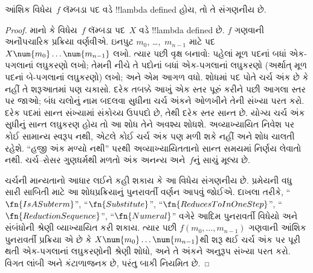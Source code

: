 \documentclass[../../../include/open-logic-section]{subfiles}
\begin{document}

\begin{thm}
આંશિક વિધેય~$f$ લૅમ્બડા પદ વડે !!{lambda defined} હોય, તો તે
સંગણનીય છે.
\end{thm}

\begin{proof}
માનો કે વિધેય~$f$ લૅમ્બડા પદ~$X$ વડે !!{lambda defined} છે.
$f$ ગણવાની અનૌપચારિક પ્રક્રિયા વર્ણવીએ. ઇનપુટ $m_0$,
\dots,~$m_{n-1}$ માટે પદ $X \num{m_0} \ldots \num{m_{n-1}}$
લખો. ત્યાર પછી વૃક્ષ બનાવો: પહેલાં મૂળ પદનાં બધાં એક-પગલાનાં
લઘુકરણો લખો; તેમની નીચે તે પદોનાં બધાં એક-પગલાનાં લઘુકરણો
(અર્થાત્ મૂળ પદનાં બે-પગલાનાં લઘુકરણો) લખો; અને એમ આગળ વધો.
શોધમાં પદ પોતે ચર્ચ અંક છે કે નહીં તે શરૂઆતમાં પણ ચકાસો.
દરેક તબક્કે આખું એક સ્તર પૂરું કરીને પછી આગલા સ્તર પર જાઓ;
બંધ ચલોનું નામ બદલવા સુધીના ચર્ચ અંકને ઓળખીને તેની સંખ્યા પરત કરો.
દરેક પદમાં સાન્ત સંખ્યામાં સંકોચ્ય ઉપપદો છે, તેથી દરેક સ્તર સાન્ત છે.
યોગ્ય ચર્ચ અંક સુધીનું સાન્ત લઘુકરણ હોય તો આ શોધ તેને અવશ્ય શોધશે.
અવ્યાખ્યાયિત નિવેશ પર કોઈ સામાન્ય સ્વરૂપ નથી, એટલે કોઈ ચર્ચ અંક પણ
મળી શકે નહીં અને શોધ ચાલતી રહેશે. ``હજી અંક મળ્યો નથી'' પરથી
અવ્યાખ્યાયિતતાનો સાન્ત સમયમાં નિર્ણય લેવાતો નથી.
ચર્ચ--રોસર ગુણધર્મથી મળતો અંક અનન્ય અને~$f$નું સાચું મૂલ્ય છે.

ચર્ચની માન્યતાનો આધાર લઈને કહી શકાય કે આ વિધેય સંગણનીય છે.
પ્રમેયની વધુ સારી સાબિતી માટે આ શોધપ્રક્રિયાનું પુનરાવર્તી વર્ણન
આપવું જોઈએ. દાખલા તરીકે,
``$\fn{IsASubterm}$'', ``$\fn{Substitute}$'',
``$\fn{ReducesToInOneStep}$'', ``$\fn{ReductionSequence}$'',
``$\fn{Numeral}$'' વગેરે આદિમ પુનરાવર્તી વિધેયો અને સંબંધોની
શ્રેણી વ્યાખ્યાયિત કરી શકાય. ત્યાર પછી $f(m_0, \dots, m_{n-1})$
ગણવાની આંશિક પુનરાવર્તી પ્રક્રિયા એ છે કે
$X \num{m_0} \dots \num{m_{n-1}}$થી શરૂ થઈ ચર્ચ અંક પર પૂરી થતી
એક-પગલાનાં લઘુકરણોની શ્રેણી શોધો, અને તે અંકને અનુરૂપ સંખ્યા
પરત કરો. વિગત લાંબી અને કંટાળાજનક છે, પરંતુ બાકી નિયમિત છે.
\end{proof}
\end{document}
